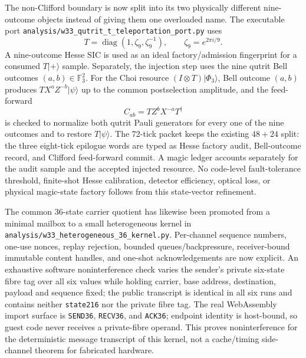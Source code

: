 The non-Clifford boundary is now split into its two physically different
nine-outcome objects instead of giving them one overloaded name.  The
executable port \texttt{analysis/w33\_qutrit\_t\_teleportation\_port.py} uses
\[
 T=\operatorname{diag}(1,\zeta_9,\zeta_9^{-1}),\qquad
 \zeta_9=e^{2\pi i/9}.
\]
A nine-outcome Hesse SIC is used as an ideal factory/admission fingerprint for
a consumed $T|+\rangle$ sample.  Separately, the injection step uses the nine
qutrit Bell outcomes $(a,b)\in\mathbb F_3^2$.  For the Choi resource
$(I\otimes T)|\Phi_3\rangle$, Bell outcome $(a,b)$ produces
$T X^a Z^{-b}|\psi\rangle$ up to the common postselection amplitude, and the
feed-forward
\[
 C_{ab}=T Z^b X^{-a}T^\dagger
\]
is checked to normalize both qutrit Pauli generators for every one of the nine
outcomes and to restore $T|\psi\rangle$.  The 72-tick packet keeps the existing
$48+24$ split: the three eight-tick epilogue words are typed as Hesse factory
audit, Bell-outcome record, and Clifford feed-forward commit.  A magic ledger
accounts separately for the audit sample and the accepted injected resource.
No code-level fault-tolerance threshold, finite-shot Hesse calibration,
detector efficiency, optical loss, or physical magic-state factory follows
from this state-vector refinement.

The common 36-state carrier quotient has likewise been promoted from a minimal
mailbox to a small heterogeneous kernel in
\texttt{analysis/w33\_heterogeneous\_36\_kernel.py}.  Per-channel sequence
numbers, one-use nonces, replay rejection, bounded queues/backpressure,
receiver-bound immutable content handles, and one-shot acknowledgements are
now explicit.  An exhaustive software noninterference check varies the sender's
private six-state fibre tag over all six values while holding carrier, base
address, destination, payload and sequence fixed; the public transcript is
identical in all six runs and contains neither \texttt{state216} nor the
private fibre tag.  The real WebAssembly import surface is
\texttt{SEND36}, \texttt{RECV36}, and \texttt{ACK36}; endpoint identity is
host-bound, so guest code never receives a private-fibre operand.  This proves
noninterference for the deterministic message transcript of this kernel, not a
cache/timing side-channel theorem for fabricated hardware.

